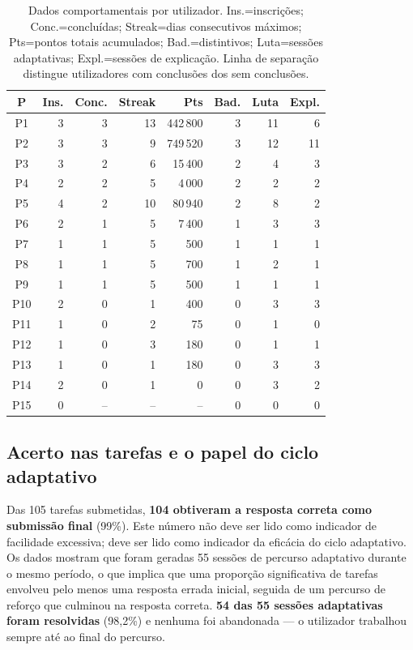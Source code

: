 \begin{table}[h]
	\centering
	\small
	\begin{tabular}{c r r r r r r r}
		\toprule
		\textbf{P} & \textbf{Ins.} & \textbf{Conc.} & \textbf{Streak} & \textbf{Pts} & \textbf{Bad.} & \textbf{Luta} & \textbf{Expl.} \\
		\midrule
		P1  & 3 & 3 & 13 & 442\,800 & 3 & 11 & 6  \\
		P2  & 3 & 3 &  9 & 749\,520 & 3 & 12 & 11 \\
		P3  & 3 & 2 &  6 &  15\,400 & 2 &  4 & 3  \\
		P4  & 2 & 2 &  5 &   4\,000 & 2 &  2 & 2  \\
		P5  & 4 & 2 & 10 &  80\,940 & 2 &  8 & 2  \\
		P6  & 2 & 1 &  5 &   7\,400 & 1 &  3 & 3  \\
		P7  & 1 & 1 &  5 &     500  & 1 &  1 & 1  \\
		P8  & 1 & 1 &  5 &     700  & 1 &  2 & 1  \\
		P9  & 1 & 1 &  5 &     500  & 1 &  1 & 1  \\
		\midrule
		P10 & 2 & 0 &  1 &     400  & 0 &  3 & 3  \\
		P11 & 1 & 0 &  2 &      75  & 0 &  1 & 0  \\
		P12 & 1 & 0 &  3 &     180  & 0 &  1 & 1  \\
		P13 & 1 & 0 &  1 &     180  & 0 &  3 & 3  \\
		P14 & 2 & 0 &  1 &       0  & 0 &  3 & 2  \\
		P15 & 0 & -- & -- &     --   & 0 &  0 & 0  \\
		\bottomrule
	\end{tabular}
	\caption[Dados de utilização por participante (anonimizados)]{Dados comportamentais por utilizador. Ins.=inscrições; Conc.=concluídas; Streak=dias consecutivos máximos; Pts=pontos totais acumulados; Bad.=distintivos; Luta=sessões adaptativas; Expl.=sessões de explicação. Linha de separação distingue utilizadores com conclusões dos sem conclusões.}
	\label{tab:por-utilizador}
\end{table}

\subsection*{Acerto nas tarefas e o papel do ciclo adaptativo}

Das 105 tarefas submetidas, \textbf{104 obtiveram a resposta correta como submissão final} (99\%). Este número não deve ser lido como indicador de facilidade excessiva; deve ser lido como indicador da eficácia do ciclo adaptativo. Os dados mostram que foram geradas 55 sessões de percurso adaptativo durante o mesmo período, o que implica que uma proporção significativa de tarefas envolveu pelo menos uma resposta errada inicial, seguida de um percurso de reforço que culminou na resposta correta. \textbf{54 das 55 sessões adaptativas foram resolvidas} (98,2\%) e nenhuma foi abandonada --- o utilizador trabalhou sempre até ao final do percurso.

